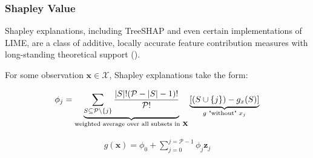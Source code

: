 \documentclass[11pt,aspectratio=169,hyperref={colorlinks}]{beamer}
\begin{document}
	\begin{frame}
	
		\frametitle{Shapley Value}	
	
		Shapley explanations, including TreeSHAP and even certain implementations of LIME, are a class of additive, locally accurate feature contribution measures with long-standing theoretical support (\cite{shapley}). 
	
		\vspace{8pt}
	
		For some observation $\mathbf{x} \in \mathcal{X}$, Shapley explanations take the form:
	
		\begin{equation}
		\label{eq:shap_contrib}
		\begin{aligned}
		\phi_{j} = \underbrace{\sum_{S \subseteq \mathcal{P} \setminus \{j\}}\frac{|S|!(\mathcal{P} -|S| -1)!}{\mathcal{P}!}}_\text{weighted average over all subsets in \textbf{X}}\underbrace{[(S \cup \{j\}) - g_x(S)]}_{g\text{ "without" }x_j}
		\end{aligned}
		\end{equation}
		
		\begin{equation}
		\label{eq:shap_additive}
		\begin{aligned}
		g(\mathbf{x}) = \phi_0 + \sum_{j=0}^{j=\mathcal{P} - 1} \phi_j \mathbf{z}_j
		\end{aligned}
		\end{equation}
	
	\end{frame}
\end{document}
